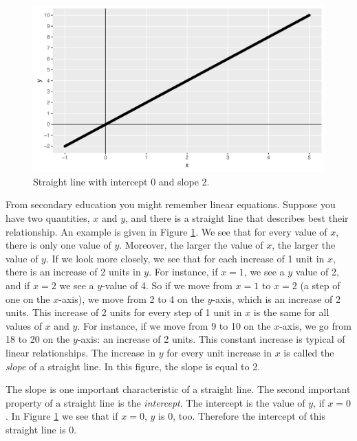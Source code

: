 \documentclass[]{book}\usepackage[]{graphicx}\usepackage[]{color}
\makeatletter
\def\maxwidth{ %
  \ifdim\Gin@nat@width>\linewidth
    \linewidth
  \else
    \Gin@nat@width
  \fi
}
\newenvironment{knitrout}{}{} %
\makeatother
\begin{document}
\begin{knitrout}
\color{fgcolor}\begin{figure}

{\centering \includegraphics[width=\maxwidth]{figure/lm_1-1} 

}

\caption[Straight line with intercept 0 and slope 2]{Straight line with intercept 0 and slope 2.}\label{fig:lm_1}
\end{figure}


\end{knitrout}


From secondary education you might remember linear equations. Suppose you have two quantities, $x$ and $y$, and there is a straight line that describes best their relationship. An example is given in Figure \ref{fig:lm_1}. We see that for every value of $x$, there is only one value of $y$. Moreover, the larger the value of $x$, the larger the value of $y$. If we look more closely, we see that for each increase of 1 unit in $x$, there is an increase of 2 units in $y$. For instance, if $x=1$, we see a $y$ value of 2, and if $x=2$ we see a $y$-value of 4. So if we move from $x=1$ to $x=2$ (a step of one on the $x$-axis), we move from 2 to 4 on the $y$-axis, which is an increase of 2 units. This increase of 2 units for every step of 1 unit in $x$ is the same for all values of $x$ and $y$. For instance, if we move from 9 to 10 on the $x$-axis, we go from 18 to 20 on the $y$-axis: an increase of 2 units. This constant increase is typical of linear relationships. The increase in $y$ for every unit increase in $x$ is called the \textit{slope} of a straight line. In this figure, the slope is equal to 2.

The slope is one important characteristic of a straight line. The second important property of a straight line is the \textit{intercept}. The intercept is the value of $y$, if $x=0$. In Figure \ref{fig:lm_1} we see that if $x=0$, $y$ is 0, too. Therefore the intercept of this straight line is 0.
\end{document}
